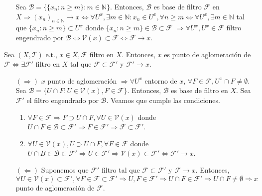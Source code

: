 \begin{dem}
  \begin{enumerate}[label=(\roman*)]
    \item []
    \item [] Sea $\mathcal{B} = \{ \{ x_{n} : n \geq m \} : m \in \mathbb{N} \}$. Entonces, $\mathcal{B}$ es base de filtro $\mathcal{F}$ en $X \Rightarrow ( x_{n} )_{n \in \mathbb{N}} \rightarrow x \Leftrightarrow \forall U^{x}, \exists m \in \mathbb{N} : x_{n} \in U^x, \forall n \geq m \Leftrightarrow \forall U^{x}, \exists m \in \mathbb{N}$ tal que $\{ x_{n} : n \geq m \} \subset U^{x}$ donde $\{ x_{n} : n \geq m \} \in \mathcal{B} \subset \mathcal{F}$ $\Rightarrow \forall U^{x}, U^{x} \in \mathcal{F}$ filtro engendrado por $\mathcal{B} \Leftrightarrow \mathcal{V}(x) \subset \mathcal{F} \Leftrightarrow \mathcal{F} \rightarrow x$.
  \end{enumerate}
\end{dem}

\begin{prop}
  Sea $( X, \mathcal{T} )$ e.t., $x \in X, \mathcal{F}$ filtro en $X$. Entonces, $x$ es punto de aglomeración de $\mathcal{F} \Leftrightarrow \exists \mathcal{F}'$ filtro en $X$ tal que $\mathcal{F} \subset \mathcal{F}'$ y $\mathcal{F}' \rightarrow x$.
\end{prop}

\begin{dem}
  \begin{enumerate}[label=(\roman*)]
    \item []
    \item [$(\Rightarrow)$] $x$ punto de aglomeración $\Rightarrow \forall U^{x}$ entorno de $x$, $\forall F \in \mathcal{F}, U^{x} \cap F \neq \emptyset$. Sea $\mathcal{B} = \{ U \cap F : U \in \mathcal{V}(x), F \in \mathcal{F} \}$. Entonces, $\mathcal{B}$ es base de filtro en $X$. Sea $\mathcal{F}'$ el filtro engendrado por $\mathcal{B}$. Veamos que cumple las condiciones.
      \begin{enumerate}[label=(\roman*)]
        \item $\forall F \in \mathcal{F} \Rightarrow F \supset U \cap F, \forall U \in \mathcal{V}(x)$ donde $U \cap F \in \mathcal{B} \subset \mathcal{F}' \Rightarrow F \in \mathcal{F}' \Rightarrow \mathcal{F} \subset \mathcal{F}'$.
        \item $\forall U \in \mathcal{V}(x), U \supset U \cap F, \forall F \in \mathcal{F}$ donde $U \cap B \in \mathcal{B} \subset \mathcal{F}' \Rightarrow U \in \mathcal{F}' \Rightarrow \mathcal{V}(x) \subset \mathcal{F}' \Leftrightarrow \mathcal{F}' \rightarrow x$.
      \end{enumerate}
    \item [$(\Leftarrow)$] Suponemos que $\mathcal{F}'$ filtro tal que $\mathcal{F} \subset \mathcal{F}'$ y $\mathcal{F} \rightarrow x$. Entonces, $\forall U \in \mathcal{V}(x) \subset \mathcal{F}', \forall F \in \mathcal{F}\subset \mathcal{F}' \Rightarrow U, F \in \mathcal{F}' \Rightarrow U \cap F \in \mathcal{F}' \Rightarrow U \cap F \neq \emptyset \Rightarrow x$ punto de aglomeración de $\mathcal{F}$.
  \end{enumerate}
\end{dem}

